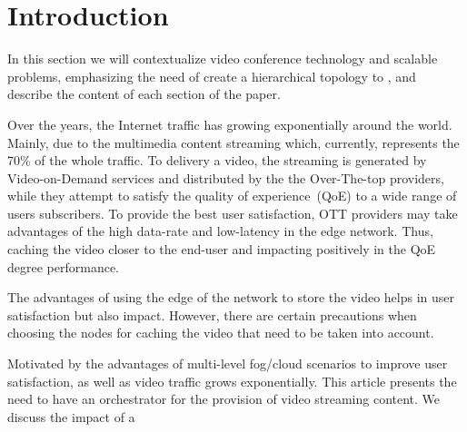 \section{Introduction}
\label{sec:introduction}

{\color{blue} In this section we will contextualize video conference technology and scalable problems, emphasizing the need of create a hierarchical topology to , and describe the content of each section of the paper.}

Over the years, the Internet traffic has growing exponentially around the world. Mainly, due to the multimedia content streaming which, currently, represents the 70\% of the whole traffic. To delivery a video, the streaming is generated by Video-on-Demand services and distributed by the the Over-The-top providers, while they attempt to satisfy the quality of experience~(QoE) to a wide range of users subscribers. To provide the best user satisfaction, OTT providers may take advantages of the high data-rate and low-latency in the edge network. Thus, caching the video closer to the end-user and impacting positively in the QoE degree performance.

The advantages of using the edge of the network to store the video helps in user satisfaction but also impact. However, there are certain precautions when choosing the nodes for caching the video that need to be taken into account. 

Motivated by the advantages of multi-level fog/cloud scenarios to improve user satisfaction, as well as video traffic grows exponentially. This article presents the need to have an orchestrator for the provision of video streaming content. We discuss the impact of a 

